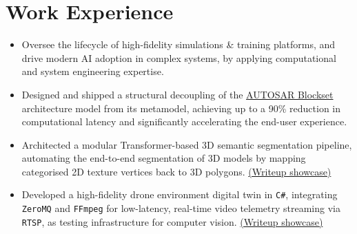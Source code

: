 \documentclass{cv}
\begin{document}
\section{Work Experience}
\begin{subsections}
    \subtitle{Simulation \& Training Systems Hub, Defence Science and Technology Agency \hfill Singapore}
    \begin{itemize}[leftmargin=!, itemindent=-1em]
        \item Oversee the lifecycle of high-fidelity simulations \& training platforms, and drive modern AI adoption in complex systems, by applying computational and system engineering expertise.
    \end{itemize}

    \subtitle{The MathWorks, Inc. \hfill Cambridge, United Kingdom}
    \begin{itemize}[leftmargin=!, itemindent=-1em]
        \item Designed and shipped a structural decoupling of the \href{https://www.mathworks.com/products/autosar.html}{AUTOSAR Blockset} architecture model from its metamodel, achieving up to a 90\% reduction in computational latency and significantly accelerating the end-user experience.
    \end{itemize}

    \subtitle{Simulation \& Training Systems Hub, Defence Science and Technology Agency \hfill Singapore}
    \begin{itemize}[leftmargin=!, itemindent=-1em]
        \item Architected a modular Transformer-based 3D semantic segmentation pipeline, automating the end-to-end segmentation of 3D models by mapping categorised 2D texture vertices back to 3D polygons. \href{https://medium.com/d-classified/segmentation-pipeline-for-3d-tiles-1303fcb5e6be}{(Writeup showcase)}
    \end{itemize}

    \subtitle{Command, Control and Communications Development, Defence Science and Technology Agency \hfill Singapore}
    \begin{itemize}[leftmargin=!, itemindent=-1em]
        \item Developed a high-fidelity drone environment digital twin in \verb|C#|, integrating \verb|ZeroMQ| and \verb|FFmpeg| for low-latency, real-time video telemetry streaming via \verb|RTSP|, as testing infrastructure for computer vision. \href{https://medium.com/d-classified/unity-as-a-testbed-for-autonomy-development-1e326323c68d}{(Writeup showcase)}
    \end{itemize}

\end{subsections}
\end{document}
